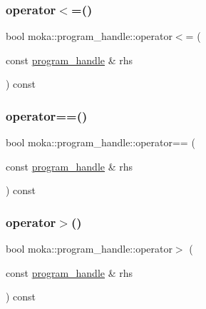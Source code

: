 \subsubsection{\texorpdfstring{operator$<$=()}{operator<=()}}
{\footnotesize\ttfamily bool moka\+::program\+\_\+handle\+::operator$<$= (\begin{DoxyParamCaption}\item[{const \mbox{\hyperlink{structmoka_1_1program__handle}{program\+\_\+handle}} \&}]{rhs }\end{DoxyParamCaption}) const\hspace{0.3cm}{\ttfamily [inline]}}

\mbox{\label{structmoka_1_1program__handle_adf3adcb48ddb694bb0c480413f657e68}} 
\subsubsection{\texorpdfstring{operator==()}{operator==()}}
{\footnotesize\ttfamily bool moka\+::program\+\_\+handle\+::operator== (\begin{DoxyParamCaption}\item[{const \mbox{\hyperlink{structmoka_1_1program__handle}{program\+\_\+handle}} \&}]{rhs }\end{DoxyParamCaption}) const\hspace{0.3cm}{\ttfamily [inline]}}

\mbox{\label{structmoka_1_1program__handle_a5a7894e919d9e88032cce7c535eaa365}} 
\subsubsection{\texorpdfstring{operator$>$()}{operator>()}}
{\footnotesize\ttfamily bool moka\+::program\+\_\+handle\+::operator$>$ (\begin{DoxyParamCaption}\item[{const \mbox{\hyperlink{structmoka_1_1program__handle}{program\+\_\+handle}} \&}]{rhs }\end{DoxyParamCaption}) const\hspace{0.3cm}{\ttfamily [inline]}}

